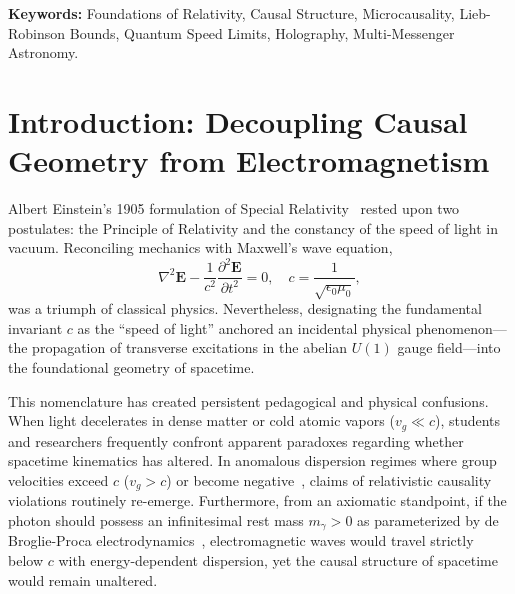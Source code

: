 \documentclass[11pt,a4paper]{article}
\begin{document}
\begin{abstract}
(v)~\textbf{Entanglement and Spacetime}: We review the conditional derivation of Einstein's equations from entanglement equilibrium ($G_{\mu\nu} + \Lambda g_{\mu\nu} = \frac{8\pi G}{c_{\mathcal{I}}^4} T_{\mu\nu}$), maintaining an explicit Critical Audit Balance Sheet distinguishing conditionally derived structures from assumed geometric inputs.
(vi)~\textbf{The Universal Causal Cone Hypothesis}: We formulate the hypothesis $c_{\text{geom}} = c_{\text{EM}} = c_{\text{grav}} = c_{\text{matter}} = c_{\text{info}} \equiv c_{\mathcal{I}}$ as a falsifiable empirical proposition, evaluating current constraints from multi-messenger gravitational wave astronomy ($|c_{\text{grav}} - c_{\text{EM}}|/c_{\mathcal{I}} \le 10^{-15}$ from GW170817), Proca mass bounds ($m_\gamma < 10^{-18}\text{ eV}/c_{\mathcal{I}}^2$), and Planck-scale modified dispersion relations.
\end{abstract}

\noindent\textbf{Keywords:} Foundations of Relativity, Causal Structure, Microcausality, Lieb-Robinson Bounds, Quantum Speed Limits, Holography, Multi-Messenger Astronomy.

\section{Introduction: Decoupling Causal Geometry from Electromagnetism}

Albert Einstein's 1905 formulation of Special Relativity~\cite{einstein1905} rested upon two postulates: the Principle of Relativity and the constancy of the speed of light in vacuum. Reconciling mechanics with Maxwell's wave equation,
\begin{equation}
\nabla^2 \mathbf{E} - \frac{1}{c^2}\frac{\partial^2 \mathbf{E}}{\partial t^2} = 0, \quad c = \frac{1}{\sqrt{\epsilon_0 \mu_0}},
\end{equation}
was a triumph of classical physics. Nevertheless, designating the fundamental invariant $c$ as the ``speed of light'' anchored an incidental physical phenomenon---the propagation of transverse excitations in the abelian $U(1)$ gauge field---into the foundational geometry of spacetime.

This nomenclature has created persistent pedagogical and physical confusions. When light decelerates in dense matter or cold atomic vapors ($v_g \ll c$), students and researchers frequently confront apparent paradoxes regarding whether spacetime kinematics has altered. In anomalous dispersion regimes where group velocities exceed $c$ ($v_g > c$) or become negative~\cite{wang2000}, claims of relativistic causality violations routinely re-emerge. Furthermore, from an axiomatic standpoint, if the photon should possess an infinitesimal rest mass $m_\gamma > 0$ as parameterized by de Broglie-Proca electrodynamics~\cite{tu2005}, electromagnetic waves would travel strictly below $c$ with energy-dependent dispersion, yet the causal structure of spacetime would remain unaltered.
\end{document}
